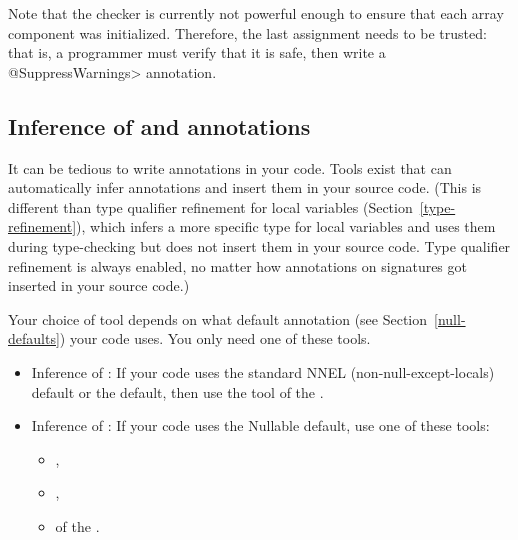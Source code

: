 Note that the checker is currently not powerful enough to ensure that
each array component was initialized. Therefore, the last assignment
needs to be trusted:  that is, a programmer must verify that it is safe,
then write a \<@SuppressWarnings> annotation.



\subsection{Inference of  and  annotations\label{nullness-inference}}

It can be tedious to write annotations in your code.  Tools exist that
can automatically infer annotations and insert them in your source code.
(This is different than type qualifier refinement for local variables
(Section~\ref{type-refinement}), which infers a more specific type for
local variables and uses them during type-checking but does not insert them
in your source code.  Type qualifier refinement is always enabled, no
matter how annotations on signatures got inserted in your source code.)

Your choice of tool depends on what default annotation (see
Section~\ref{null-defaults}) your code uses.  You only need one of these tools.

\begin{itemize}

\item
  Inference of :
  If your code uses the standard NNEL (non-null-except-locals) default or
  the  default, then use the
  tool of the .

\item
  Inference of :
  If your code uses the Nullable default, use one of these tools:
\begin{itemize}
\item
  ,
\item
  ,
\item
   of the .
\end{itemize}

\end{itemize}



